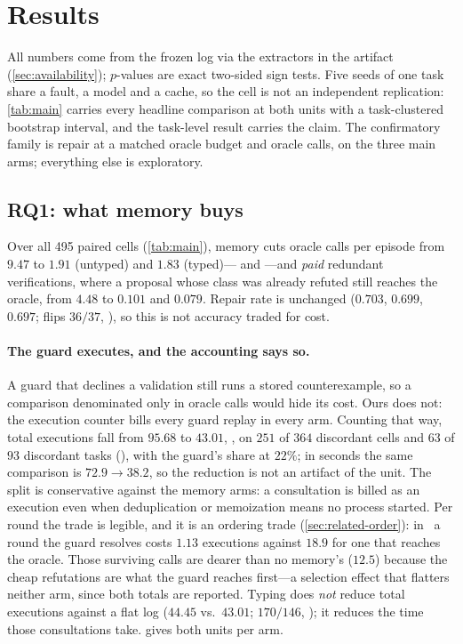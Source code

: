 \section{Results}
\label{sec:results}

All numbers come from the frozen log via the extractors in the artifact
(\cref{sec:availability}); $p$-values are exact two-sided sign tests. Five
seeds of one task share a fault, a model and a cache, so the cell is not an
independent replication: \cref{tab:main} carries every headline comparison at
both units with a task-clustered bootstrap interval, and the task-level result
carries the claim. The confirmatory family is repair at a matched oracle budget
and oracle calls, on the three main arms; everything else is exploratory.

\subsection{RQ1: what memory buys}
\label{sec:results-cost}



Over all \num{495} paired cells (\cref{tab:main}), memory cuts oracle calls per
episode from $9.47$ to $1.91$ (untyped) and $1.83$ (typed)--- and
---and \emph{paid} redundant verifications, where a proposal whose
class was already refuted still reaches the oracle, from $4.48$ to $0.101$ and
$0.079$. Repair rate is unchanged ($0.703$, $0.699$, $0.697$; flips $36/37$,
), so this is not accuracy traded for cost.

\paragraph{The guard executes, and the accounting says so.}
A guard that declines a validation still runs a stored counterexample, so a
comparison denominated only in oracle calls would hide its cost. Ours does not:
the execution counter bills every guard replay in every arm. Counting that way,
total executions fall from $95.68$ to $43.01$, , on $251$ of $364$
discordant cells and $63$ of $93$ discordant tasks (), with the
guard's share at $22\%$; in seconds the same comparison is $72.9 \to 38.2$, so
the reduction is not an artifact of the unit. The split is conservative against
the memory arms: a consultation is billed as an execution even when
deduplication or memoization means no process started. Per round the trade is
legible, and it is an ordering trade (\cref{sec:related-order}): in \armtyped\
a round the guard resolves costs $1.13$ executions against $18.9$ for one that
reaches the oracle. Those surviving calls are dearer than no memory's ($12.5$)
because the cheap refutations are what the guard reaches first---a selection
effect that flatters neither arm, since both totals are reported. Typing does
\emph{not} reduce total executions against a flat log ($44.45$ vs.\ $43.01$;
$170/146$, \pval{0.20}); it reduces the time those consultations take.
\appref{tab:testwork}{The supplement} gives both units per arm.

